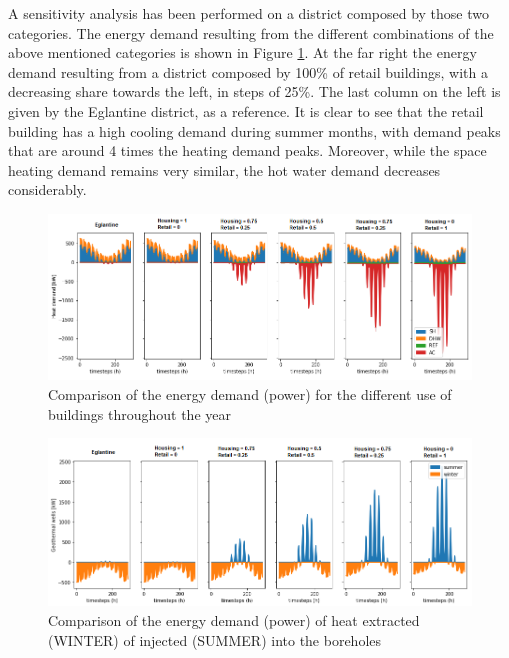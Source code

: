 \documentclass{article}
\begin{document}
A sensitivity analysis has been performed on a district composed by those two categories. The energy demand resulting from the different combinations of the above mentioned categories is shown in Figure \ref{fig:CU_E}. At the far right the energy demand resulting from a district composed by 100\% of retail buildings, with a decreasing share towards the left, in steps of 25\%. The last column on the left is given by the Eglantine district, as a reference. It is clear to see that the retail building has a high cooling demand during summer months, with demand peaks that are around 4 times the heating demand peaks. Moreover, while the space heating demand remains very similar, the hot water demand decreases considerably.\\



\begin{figure}[htp]
	\centering
	\includegraphics[width=1\textwidth]{CU_Edemand.png}
	\caption{Comparison of the energy demand (power) for the different use of buildings throughout the year}
	\label{fig:CU_E}
\end{figure}

\begin{figure}[htp]
	\centering
	\includegraphics[width=1\textwidth]{CU_gtw.png}
	\caption{Comparison of the energy demand (power) of heat extracted (WINTER) of injected (SUMMER) into the boreholes}
	\label{fig:CU_gtw}
\end{figure}
\end{document}
